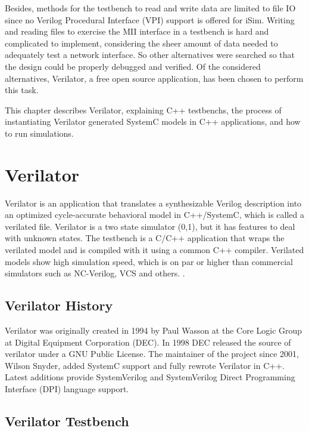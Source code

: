\documentclass[defaultstyle,10pt,master,Helvetica]{thesis}
\begin{document}
Besides, methods for the testbench to read and write data are limited to file \ac{IO} since no Verilog Procedural Interface (VPI) support is offered for iSim. Writing and reading files to exercise the MII interface in a testbench is hard and complicated to implement, considering the sheer amount of data needed to adequately test a network interface.  So other alternatives were searched so that the design could be properly debugged and verified. Of the considered alternatives, Verilator, a free open source application, has been chosen to perform this task.

This chapter describes Verilator, explaining C++ testbenchs, the process of instantiating Verilator generated SystemC models in C++ applications, and how to run simulations.


\section{Verilator}

Verilator is an application that translates a synthesizable Verilog description into an optimized cycle-accurate behavioral model in C++/SystemC, which is called a verilated file. Verilator is a two state simulator (0,1), but it has features to deal with unknown states. The testbench is a C/C++ application that wraps the verilated model and is compiled with it using a common C++ compiler. Verilated models show high simulation speed, which is on par or higher than commercial simulators such as NC-Verilog, VCS and others. \cite{veribench}.

\subsection{Verilator History}
Verilator was originally created in 1994 by Paul Wasson at the Core Logic Group at Digital Equipment Corporation (DEC). In 1998 DEC released the source of verilator under a GNU Public License. The maintainer of the project since 2001, Wilson Snyder, added SystemC support and fully rewrote Verilator in C++. Latest additions provide SystemVerilog and SystemVerilog Direct Programming Interface (DPI) language support\cite[p. 65]{verilatorman}.

\subsection{Verilator Testbench}

\end{document}
